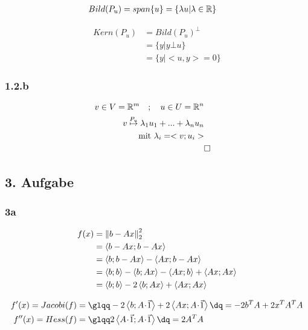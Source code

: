 \begin{equation}\begin{split}
	Bild(P_u) &= span\{u\} = \{\lambda u| \lambda \in {\mathbb R}\}
\end{split}\end{equation}

\begin{equation}\begin{split}
	Kern(P_u) &= Bild(P_u)^{\bot}\\
	&= \{y | y \bot u\}\\
	&= \{y | <u,y> = 0\}
\end{split}\end{equation}

\subsubsection*{1.2.b}
\begin{equation}\begin{split}
	v \in V = \R^m \quad ; \quad u \in U = \R^n\\
	v \stackrel{P_u}{\mapsto} \lambda_1u_1 + ... + \lambda_nu_n \\ %
	\text{mit } \lambda_i = <v; u_i>\\
	&\square
\end{split}\end{equation}

\subsection*{3. Aufgabe}
\subsubsection*{3a}
\begin{equation}\begin{split}
	f(x) &= \left\lVert b-Ax\right\rVert_2^2 \\
	&= \left\langle b-Ax;b-Ax\right\rangle  \\
	&= \left\langle b;b-Ax\right\rangle - \left\langle Ax;b-Ax\right\rangle \\
	&= \left\langle b;b\right\rangle - \left\langle b;Ax\right\rangle -\left\langle Ax;b\right\rangle + \left\langle Ax;Ax\right\rangle \\
	&= \left\langle b;b\right\rangle -2\left\langle b;Ax\right\rangle + \left\langle Ax;Ax\right\rangle \\
\end{split}\end{equation}

\begin{equation}\begin{split}
	f'(x) = Jacobi(f) &= \glqq-2\scalprod{b}{A \scdot \vec{1}}  + 2\scalprod{Ax}{A\scdot \vec{1}}\dq = -2b^TA + 2 x^TA^TA \\
	f''(x) = Hess(f) &= \glqq 2\scalprod{A \scdot \vec{1}}{A \scdot \vec{1}} \dq = 2A^TA\\
\end{split}\end{equation}

